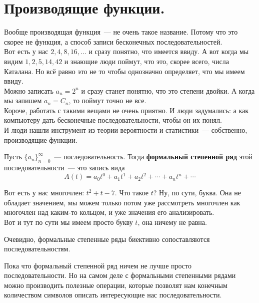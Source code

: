\documentclass{article}
\begin{document}
    \section{Производящие функции.}
    \begin{remark}
        Вообще производящая функция~--- не очень такое название. Потому что это скорее не функция, а способ записи бесконечных последовательностей.\\
        Вот есть у нас $2,4,8,16,\ldots$ и сразу понятно, что имеется ввиду. А вот когда мы видим $1,2,5,14,42$ и знающие люди поймут, что это, скорее всего, числа Каталана. Но всё равно это не то чтобы однозначно определяет, что мы имеем ввиду.\\
        Можно записать $a_n=2^n$ и сразу станет понятно, что это степени двойки. А когда мы запишем $a_n=C_n$, то поймут точно не все.\\
        Короче, работать с такими вещами не очень приятно. И люди задумались: а как компьютеру дать бесконечные последовательности, чтобы он их понял.\\
        И люди нашли инструмент из теории вероятности и статистики~--- собственно, производящие функции.
    \end{remark}
    \begin{definition}
        Пусть $\{a_n\}_{n=0}^\infty$~--- последовательность. Тогда \textbf{формальный степенной ряд} этой последовательности~--- это запись вида
        $$
        A(t)=a_0t^0+a_1t^1+a_2t^2+\cdots+a_nt^n+\cdots
        $$
    \end{definition}
    \begin{remark}
        Вот есть у нас многочлен: $t^2+t-7$. Что такое $t$? Ну, по сути, буква. Она не обладает значением, мы можем только потом уже рассмотреть многочлен как многочлен над каким-то кольцом, и уже значения его анализировать.\\
        Вот и тут по сути мы имеем просто букву $t$, она ничему не равна.
    \end{remark}
    \begin{claim}
        Очевидно, формальные степенные ряды биективно сопоставляются последовательностям.
    \end{claim}
    \begin{remark}
        Пока что формальный степенной ряд ничем не лучше просто последовательности. Но на самом деле с формальными степенными рядами можно производить полезные операции, которые позволят нам конечным количеством символов описать интересующие нас последовательности.
    \end{remark}
\end{document}
